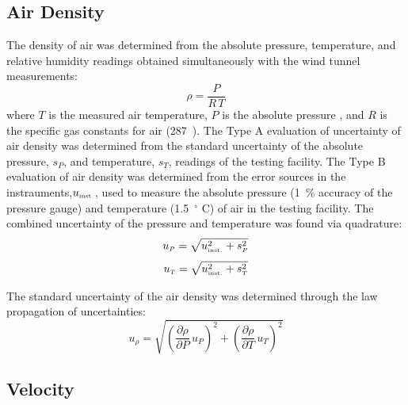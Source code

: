 \documentclass[12pt]{article}
\begin{document}
\subsection{Air Density}
\label{ssec:ADUncertainty}

The density of air was determined from the absolute pressure, temperature, and relative humidity readings obtained simultaneously with the wind tunnel measurements:
\begin{equation}
\rho  =  \frac{P}{R\,T}
\end{equation}
where $T$ is the measured air temperature, $P$ is the absolute pressure , and  $R$ is the specific gas constants for air (287~\si{}). The Type A evaluation of uncertainty of air density was determined from the standard uncertainty of the absolute pressure, $s_{\scriptscriptstyle P}$, and temperature, $s_{\scriptscriptstyle T}$, readings of the testing facility. The Type B evaluation of air density was determined from the error sources in the instrauments,$ u_{\rm \scriptscriptstyle inst.}$, used to measure the absolute pressure (1~\% accuracy of the pressure gauge) and temperature (1.5~$^{\circ}$ C) of air in the testing facility. The combined uncertainty of the pressure and temperature was found via quadrature:
\begin{equation}
\label{eq:abspressureuncertainty}
u_{\scriptscriptstyle P} = \sqrt{ u_{\rm \scriptscriptstyle inst.}^2 + s_{\scriptscriptstyle P}^2}
\end{equation}
\begin{equation}
\label{eq:tempuncertainty}
u_{\scriptscriptstyle T} = \sqrt{ u_{\rm \scriptscriptstyle inst.}^2 + s_{\scriptscriptstyle T}^2}
\end{equation}

The standard uncertainty of the air density was determined through the law propagation of uncertainties:
\begin{equation}
\label{eq:Densityuncertainty}
u_{\scriptscriptstyle \rho} = \sqrt{{\left( \frac{\partial \rho}{\partial P}\,u_{\scriptscriptstyle P} \right) }^2+{\left(\frac{\partial \rho}{\partial T}\,u_{\scriptscriptstyle T}\right)}^2}
\end{equation}

\subsection{Velocity}
\label{ssec:VelUncertainty}
\end{document}
